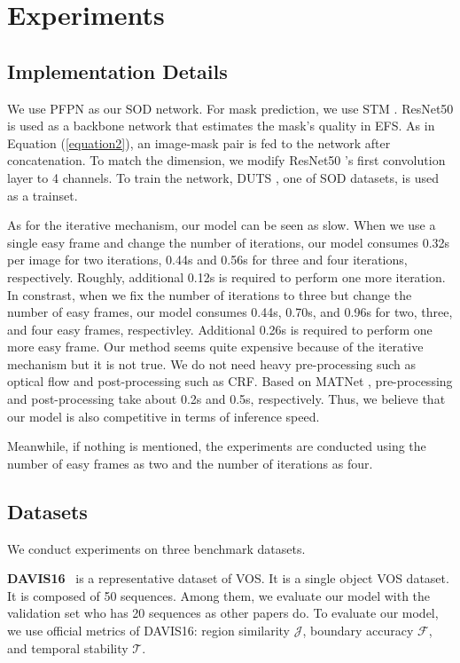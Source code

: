 \documentclass[letterpaper]{article} \usepackage{aaai22}  \usepackage{times}  \usepackage{helvet}  \usepackage{courier}  \usepackage[hyphens]{url}  \usepackage{graphicx} \urlstyle{rm} \def\UrlFont{\rm}  \usepackage{natbib}  \usepackage{caption} \DeclareCaptionStyle{ruled}{labelfont=normalfont,labelsep=colon,strut=off} \frenchspacing  \setlength{\pdfpagewidth}{8.5in}  \setlength{\pdfpageheight}{11in}  \usepackage{algorithm}
\renewcommand{\paragraph}[1]{\vspace{1mm}\noindent\textbf{#1}}
\begin{document}
\section{Experiments}

\subsection{Implementation Details}

We use PFPN \citep{wang2020progressive} as our SOD network. For mask prediction, we use STM \citep{oh2019video}. ResNet50 \citep{he2016deep} is used as a backbone network that estimates the mask’s quality in EFS. As in Equation (\ref{equation2}), an image-mask pair is fed to the network after concatenation. To match the dimension, we modify ResNet50 \citep{he2016deep}’s first convolution layer to 4 channels.
To train the network, DUTS \citep{wang2017learning}, one of SOD datasets, is used as a trainset. 

As for the iterative mechanism, our model can be seen as slow.
When we use a single easy frame and change the
number of iterations, our model consumes 0.32s per image
for two iterations, 0.44s and 0.56s for three and four iterations, respectively. Roughly, additional 0.12s is required to perform one more iteration. In constrast, when we fix the
number of iterations to three but change the number of easy
frames, our model consumes 0.44s, 0.70s, and 0.96s for two,
three, and four easy frames, respectivley. Additional 0.26s is
required to perform one more easy frame. Our method seems
quite expensive because of the iterative mechanism but it is
not true. We do not need heavy pre-processing such as optical flow and post-processing such as CRF. Based on MATNet \citep{zhou2020motion}, pre-processing and post-processing take about 0.2s and
0.5s, respectively. Thus, we believe that our model is also
competitive in terms of inference speed.

Meanwhile, if nothing is mentioned, the experiments are conducted using the number of easy frames as two and the number of iterations as four. 

\subsection{Datasets}

We conduct experiments on three benchmark datasets.

\paragraph{DAVIS16}~\citep{Perazzi2016} is a representative dataset of VOS. It is a single object VOS dataset. It is composed of 50 sequences. Among them, we evaluate our model with the validation set who has 20 sequences as other papers do. To evaluate our model, we use official metrics of DAVIS16: region similarity $\mathcal{J}$, boundary accuracy $\mathcal{F}$, and temporal stability $\mathcal{T}$.
\end{document}
